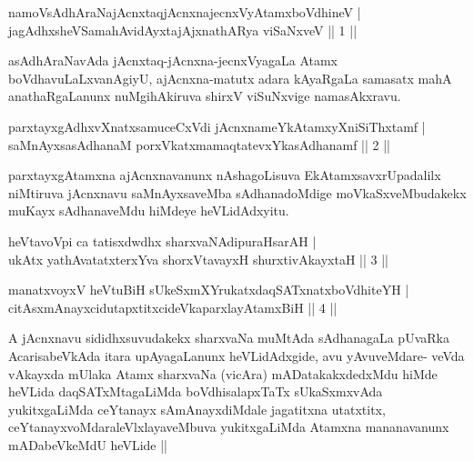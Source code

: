 
\centerline{}

\begin{shl}
namoV\s sAdhAraNajAcnxtaqjAcnxnajecnxVyAtamxboVdhineV |\\
jagAdhxsheVSamahAvidAyxtajAjxnathARya viSaNxveV \hfill || 1 ||
\end{shl}

\begin{artha}
asAdhAraNavAda jAcnxtaq-jAcnxna-jecnxVyagaLa Atamx boVdhavuLaLxvanAgiyU, ajAcnxna-matutx adara kAyaRgaLa samasatx mahA anathaRgaLanunx nuMgihAkiruva shirxV viSuNxvige namasAkxravu.
\end{artha}

\begin{shl}
parxtayxgAdhxvXnatxsamuceCxVdi jAcnxnameYkAtamxyXniSiThxtamf |\\
saMnAyxsasAdhanaM porxVkatxmamaqtatevxYkasAdhanamf \hfill || 2 ||
\end{shl}

\begin{artha}
parxtayxgAtamxna ajAcnxnavanunx nAshagoLisuva EkAtamxsavxrUpadalilx niMtiruva jAcnxnavu saMnAyxsaveMba sAdhanadoMdige moVkaSxveMbudakekx muKayx sAdhanaveMdu hiMdeye heVLidAdxyitu.
\end{artha}


\begin{shl}
heVtavoV\s pi ca tatisxdwdhx sharxvaNAdipuraHsarAH |\\
ukAtx yathAvatatxterxYva shorxVtavayxH shurxtivAkayxtaH \hfill || 3 ||
\end{shl}
\begin{shl}
manatxvoyxV heVtuBiH sUkeSxmXYrukatxdaqSATxnatxboVdhiteYH |\\
citAsxmAnayxcidutapxtitxcideVkaparxlayAtamxBiH \hfill || 4 ||
\end{shl}

\begin{artha}
A jAcnxnavu sididhxsuvudakekx sharxvaNa muMtAda sAdhanagaLa pUvaRka
AcarisabeVkAda itara upAyagaLanunx heVLidAdxgide, avu yAvuveMdare-
veVda vAkayxda mUlaka Atamx sharxvaNa (vicAra) mADatakakxdedxMdu hiMde
heVLida daqSATxMtagaLiMda boVdhisalapxTaTx sUkaSxmxvAda yukitxgaLiMda
ceYtanayx sAmAnayxdiMdale jagatitxna utatxtitx,
ceYtanayxvoMdaraleVlxlayaveMbuva yukitxgaLiMda Atamxna mananavanunx
mADabeVkeMdU heVLide ||
\end{artha}

